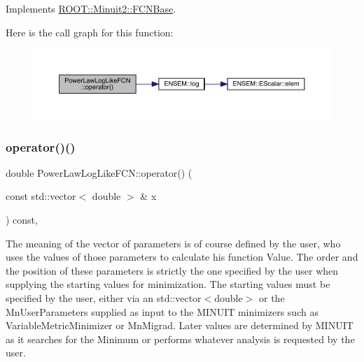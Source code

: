 Implements \mbox{\hyperlink{classROOT_1_1Minuit2_1_1FCNBase_ae4a86bd94d0d0f5ca6fc8f8ab2bb43cd}{R\+O\+O\+T\+::\+Minuit2\+::\+F\+C\+N\+Base}}.

Here is the call graph for this function\+:
\nopagebreak
\begin{figure}[H]
\begin{center}
\leavevmode
\includegraphics[width=350pt]{dc/d0f/classPowerLawLogLikeFCN_a279b7010b6b252d0772e5d561f749386_cgraph}
\end{center}
\end{figure}
\mbox{\label{classPowerLawLogLikeFCN_a279b7010b6b252d0772e5d561f749386}} 
\subsubsection{\texorpdfstring{operator()()}{operator()()}\hspace{0.1cm}{\footnotesize\ttfamily [2/2]}}
{\footnotesize\ttfamily double Power\+Law\+Log\+Like\+F\+C\+N\+::operator() (\begin{DoxyParamCaption}\item[{const std\+::vector$<$ double $>$ \&}]{x }\end{DoxyParamCaption}) const\hspace{0.3cm}{\ttfamily [inline]}, {\ttfamily [virtual]}}

The meaning of the vector of parameters is of course defined by the user, who uses the values of those parameters to calculate his function Value. The order and the position of these parameters is strictly the one specified by the user when supplying the starting values for minimization. The starting values must be specified by the user, either via an std\+::vector$<$double$>$ or the Mn\+User\+Parameters supplied as input to the M\+I\+N\+U\+IT minimizers such as Variable\+Metric\+Minimizer or Mn\+Migrad. Later values are determined by M\+I\+N\+U\+IT as it searches for the Minimum or performs whatever analysis is requested by the user.


